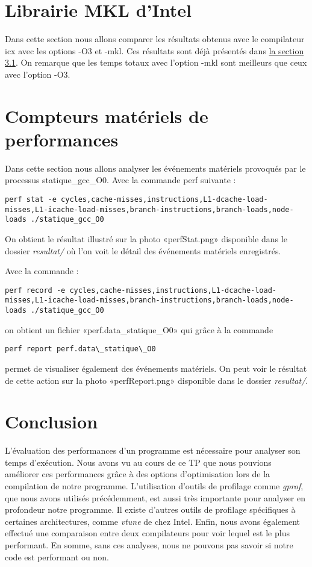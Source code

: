 \documentclass{rapport}
\begin{document}
\part{Librairie MKL d'Intel}
Dans cette section nous allons comparer les résultats obtenus avec le compilateur icx avec les options -O3 et -mkl. Ces résultats sont déjà présentés dans \hyperref[sec:mkl]{la section 3.1}. On remarque que les temps totaux avec l'option -mkl sont meilleurs que ceux avec l'option -O3.

\part{Compteurs matériels de performances}
Dans cette section nous allons analyser les événements matériels provoqués par le processus statique\_gcc\_O0.
Avec la commande perf suivante :
\begin{lstlisting}
perf stat -e cycles,cache-misses,instructions,L1-dcache-load-misses,L1-icache-load-misses,branch-instructions,branch-loads,node-loads ./statique_gcc_O0
\end{lstlisting}
On obtient le résultat illustré sur la photo «perfStat.png» disponible dans le dossier \textit{resultat/} où l'on voit le détail des événements matériels enregistrés.

Avec la commande : %
\begin{lstlisting}
perf record -e cycles,cache-misses,instructions,L1-dcache-load-misses,L1-icache-load-misses,branch-instructions,branch-loads,node-loads ./statique_gcc_O0
\end{lstlisting}
on obtient un fichier «perf.data\_statique\_O0» qui grâce à la commande
\begin{lstlisting}
perf report perf.data\_statique\_O0
\end{lstlisting}
permet de visualiser également des événements matériels. On peut voir le résultat de cette action sur la photo «perfReport.png» disponible dans le dossier \textit{resultat/}.

\clearpage
\part{Conclusion}
L'évaluation des performances d'un programme est nécessaire pour analyser son temps d'exécution. Nous avons vu au cours de ce TP que nous pouvions améliorer ces performances grâce à des options d'optimisation lors de la compilation de notre programme. L'utilisation d'outils de profilage comme \textit{gprof}, que nous avons utilisés précédemment, est aussi très importante pour analyser en profondeur notre programme. Il existe d'autres outils de profilage spécifiques à certaines architectures, comme \textit{vtune} de chez Intel. Enfin, nous avons également effectué une comparaison entre deux compilateurs pour voir lequel est le plus performant.
\newline
En somme, sans ces analyses, nous ne pouvons pas savoir si notre code est performant ou non.
\end{document}
